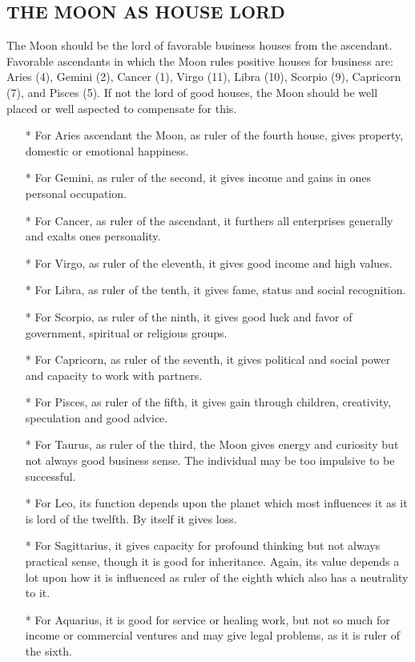  

\subsection{THE MOON AS HOUSE LORD}
 

The Moon should be the lord of favorable business houses from the ascendant. Favorable ascendants in which the Moon rules positive houses for business are: Aries (4), Gemini (2), Cancer (1), Virgo (11), Libra (10), Scorpio (9), Capricorn (7), and Pisces (5). If not the lord of good houses, the Moon should be well placed or well aspected to compensate for this.        

 

\begin{enumerate}
\item[*] For Aries ascendant the Moon, as ruler of the fourth house, gives property, domestic or emotional happiness.
\item[*] For Gemini, as ruler of the second, it gives income and gains in ones personal occupation.
\item[*] For Cancer, as ruler of the ascendant, it furthers all enterprises generally and exalts ones personality.
\item[*] For Virgo, as ruler of the eleventh, it gives good income and high values.
\item[*] For Libra, as ruler of the tenth, it gives fame, status and social recognition.
\item[*] For Scorpio, as ruler of the ninth, it gives good luck and favor of government, spiritual or religious groups.
\item[*] For Capricorn, as ruler of the seventh, it gives political and social power and capacity to work with partners.
\item[*] For Pisces, as ruler of the fifth, it gives gain through children, creativity, speculation and good advice.
\item[*] For Taurus, as ruler of the third, the Moon gives energy and curiosity but not always good business sense. The individual may be too impulsive to be successful.
\item[*] For Leo, its function depends upon the planet which most influences it as it is lord of the twelfth. By itself it gives loss.
\item[*] For Sagittarius, it gives capacity for profound thinking but not always practical sense, though it is good for inheritance. Again, its value depends a lot upon how it is influenced as ruler of the eighth which also has a neutrality to it.
\item[*] For Aquarius, it is good for service or healing work, but not so much for income or commercial ventures and may give legal problems, as it is ruler of the sixth.
 \end{enumerate}


